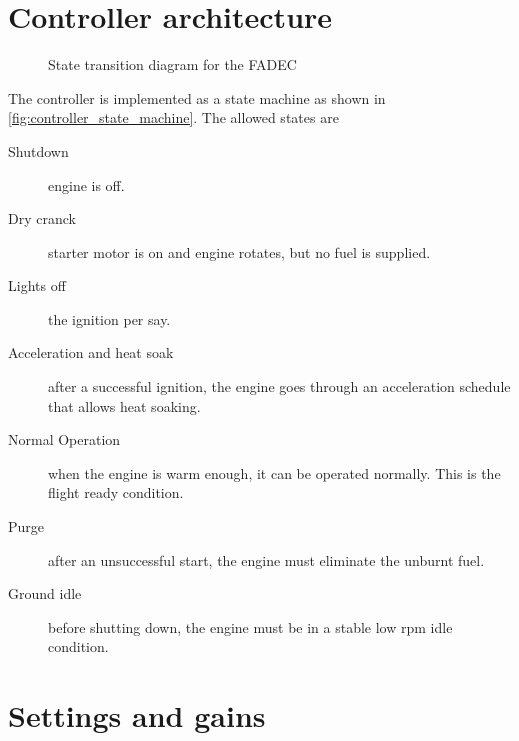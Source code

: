 \documentclass[tcc]{subfiles}
\begin{document}
\section{Controller architecture}
\begin{figure}[tp]
    \centering
    \caption{State transition diagram for the \acs{FADEC}}
    
    
    \source{\authorsfigure}
    \label{fig:controller_state_machine}
\end{figure}
The controller is implemented as a state machine \cite{amd_state_machine} 
 as shown in \autoref{fig:controller_state_machine}. 
The allowed states are
\begin{description}
    \item[Shutdown] engine is off. 
    \item[Dry cranck] starter motor is on and engine rotates,
          but no fuel is supplied.
    \item[Lights off] the ignition per say. 
    \item[Acceleration and heat soak] after a successful ignition,
          the engine goes through an acceleration schedule that allows heat soaking. 
    \item[Normal Operation] when the engine is warm enough, it can be operated normally.
          This is the flight ready condition.
    \item[Purge] after an unsuccessful start, the engine must eliminate the unburnt fuel. 
    \item[Ground idle] before shutting down, the engine must be in a stable low rpm idle condition.
\end{description}


\section{Settings and gains}
\end{document}
